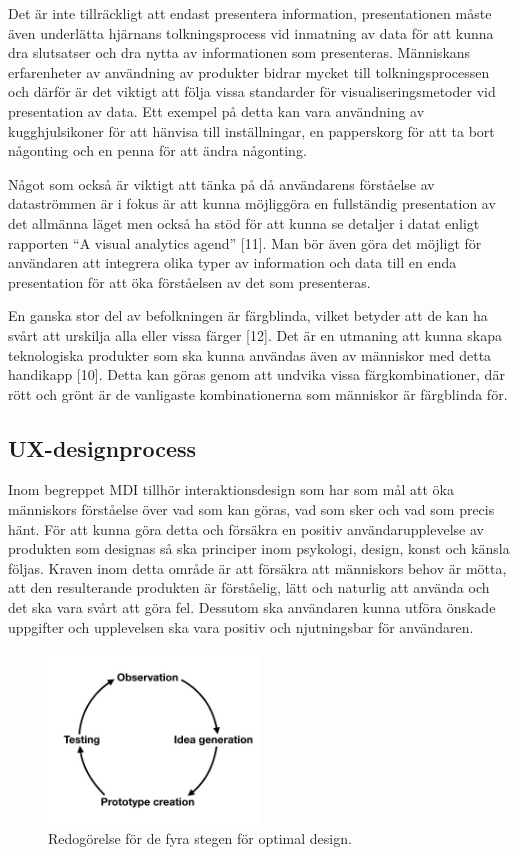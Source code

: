 \documentclass{kththesis}
\begin{document}
Det är inte tillräckligt att endast presentera information, presentationen måste även underlätta hjärnans tolkningsprocess vid inmatning av data för att kunna dra slutsatser och dra nytta av informationen som presenteras. Människans erfarenheter av användning av produkter bidrar mycket till tolkningsprocessen och därför är det viktigt att följa vissa standarder för visualiseringsmetoder vid presentation av data. Ett exempel på detta kan vara användning av kugghjulsikoner för att hänvisa till inställningar, en papperskorg för att ta bort någonting och en penna för att ändra någonting. 

Något som också är viktigt att tänka på då användarens förståelse av dataströmmen är i fokus är att kunna möjliggöra en fullständig presentation av det allmänna läget men också ha stöd för att kunna se detaljer i datat enligt rapporten “A visual analytics agend” [11]. Man bör även göra det möjligt för användaren att integrera olika typer av information och data till en enda presentation för att öka förståelsen av det som presenteras.

En ganska stor del av befolkningen är färgblinda, vilket betyder att de kan ha svårt att urskilja alla eller vissa färger [12]. Det är en utmaning att kunna skapa teknologiska produkter som ska kunna användas även av människor med detta handikapp [10]. Detta kan göras genom att undvika vissa färgkombinationer, där rött och grönt är de vanligaste kombinationerna som människor är färgblinda för.


\subsection{UX-designprocess}


Inom begreppet MDI tillhör interaktionsdesign som har som mål att öka människors förståelse över vad som kan göras, vad som sker och vad som precis hänt. För att kunna göra detta och försäkra en positiv användarupplevelse av produkten som designas så ska principer inom psykologi, design, konst och känsla följas. Kraven inom detta område är att försäkra att människors behov är mötta, att den resulterande produkten är förståelig, lätt och naturlig att använda och det ska vara svårt att göra fel. Dessutom ska användaren kunna utföra önskade uppgifter och upplevelsen ska vara positiv och njutningsbar för användaren.           

\captionsetup[figure]{name=Figur}

\begin{figure}[h]
\centering
\includegraphics[width=0.5\textwidth]{PrototypeCreation}
\caption{Redogörelse för de fyra stegen för optimal design.}
\end{figure}
\end{document}
